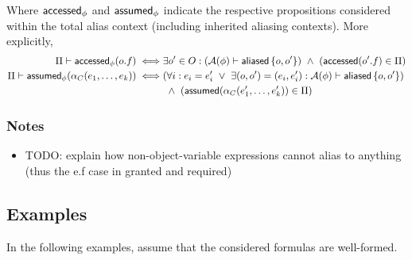 \noindent
Where $\textsf{accessed}_\phi$ and $\textsf{assumed}_\phi$ indicate the respective propositions considered within the total alias context (including inherited aliasing contexts). More explicitly,
\begin{align*}
\Pi \entails \accessed_\phi(o.f) \iff &
  \exists o\p \in O :
  (\A(\phi) \entails \aliased\set{o, o\p}) \ \land \
  (\accessed(o\p.f) \in \Pi)
\\
\Pi \entails \assumed_\phi(\alpha_C(e_1, \dots, e_k)) \iff &
  (\forall i :
    e_i = e\p_i \ \lor \ %
    \exists (o, o\p) = (e_i, e\p_i) : \A(\phi) \entails \aliased\set{o, o\p}
  )
  \\ & \ \land \
  (\assumed(\alpha_C(e\p_1, \dots, e\p_k)) \in \Pi)
\end{align*}

\subsubsection{Notes}

\begin{itemize}
  \item TODO: explain how non-object-variable expressions cannot alias to anything (thus the e.f case in granted and required)
\end{itemize}

\newpage
\subsection{Examples}

In the following examples, assume that the considered formulas are well-formed.

